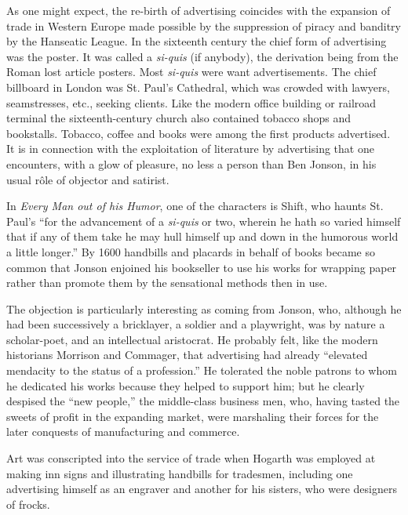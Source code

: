 \documentclass[nohyper,openany,nobib]{tufte-book}
\begin{document}
As one might expect, the re-birth of advertising coincides with the
expansion of trade in Western Europe made possible by the suppression of
piracy and banditry by the Hanseatic League. In the sixteenth century
the chief form of advertising was the poster. It was called a
\emph{si-quis} (if anybody), the derivation being from the Roman lost
article posters. Most \emph{si-quis} were want advertisements. The chief
billboard in London was St. Paul's Cathedral, which was crowded with
lawyers, seamstresses, etc., seeking clients. Like the modern office
building or railroad terminal the sixteenth-century church also
contained tobacco shops and bookstalls. Tobacco, coffee and books were
among the first products advertised. It is in connection with the
exploitation of literature by advertising that one encounters, with a
glow of pleasure, no less a person than Ben Jonson, in his usual r\^ole of
objector and satirist.

In \emph{Every Man out of his Humor}, one of the characters is Shift,
who haunts St. Paul's ``for the advancement of a \emph{si-quis} or two,
wherein he hath so varied himself that if any of them take he may hull
himself up and down in the humorous world a little longer.'' By 1600
handbills and placards in behalf of books became so common that Jonson
enjoined his bookseller to use his works for wrapping paper rather than
promote them by the sensational methods then in use.

The objection is particularly interesting as coming from Jonson, who,
although he had been successively a bricklayer, a soldier and a
playwright, was by nature a scholar-poet, and an intellectual
aristocrat. He probably felt, like the modern historians Morrison and
Commager, that advertising had already ``elevated mendacity to the
status of a profession.'' He tolerated the noble patrons to whom he
dedicated his works because they helped to support him; but he clearly
despised the ``new people,'' the middle-class business men, who, having
tasted the sweets of profit in the expanding market, were marshaling
their forces for the later conquests of manufacturing and commerce.

Art was conscripted into the service of trade when Hogarth was employed
at making inn signs and illustrating handbills for tradesmen, including
one advertising himself as an engraver and another for his sisters, who
were designers of frocks.
\end{document}
